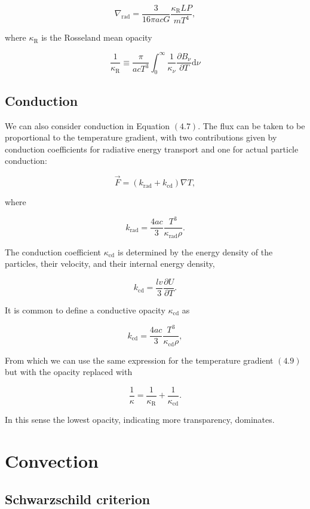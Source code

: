 \documentclass[twocolumn]{article}
\begin{document}
\[\nabla_\mathrm{rad}=\frac{3}{16\pi a c G}\frac{\kappa_\mathrm{R} L P}{m T^4},\]

where \(\kappa_\mathrm{R}\) is the Rosseland mean opacity

\[\frac{1}{\kappa_\mathrm{R}}\equiv \frac{\pi}{acT^3}\int_0^\infty\frac{1}{\kappa_\nu}\frac{\partial B_\nu}{\partial T}\mathrm{d}\nu\]

\hypertarget{conduction}{%
\subsection{Conduction}\label{conduction}}

We can also consider conduction in Equation \((4.7)\). The flux can be
taken to be proportional to the temperature gradient, with two
contributions given by conduction coefficients for radiative energy
transport and one for actual particle conduction:

\[\vec{F}=(k_\mathrm{rad}+k_\mathrm{cd})\nabla T,\]

where

\[k_\mathrm{rad}=\frac{4ac}{3}\frac{T^3}{\kappa_\mathrm{rad}\rho}.\]

The conduction coefficient \(\kappa_\mathrm{cd}\) is determined by the
energy density of the particles, their velocity, and their internal
energy density,

\[k_\mathrm{cd}=\frac{lv}{3}\frac{\partial U}{\partial T}.\]

It is common to define a conductive opacity \(\kappa_\mathrm{cd}\) as

\[k_\mathrm{cd}=\frac{4ac}{3}\frac{T^3}{\kappa_\mathrm{cd}\rho},\]

From which we can use the same expression for the temperature gradient
\((4.9)\) but with the opacity replaced with

\[\frac{1}{\kappa}=\frac{1}{\kappa_\mathrm{R}}+\frac{1}{\kappa_\mathrm{cd}}.\]

In this sense the lowest opacity, indicating more transparency,
dominates.

\hypertarget{convection}{%
\section{Convection}\label{convection}}

\hypertarget{schwarzschild-criterion}{%
\subsection{Schwarzschild criterion}\label{schwarzschild-criterion}}
\end{document}

